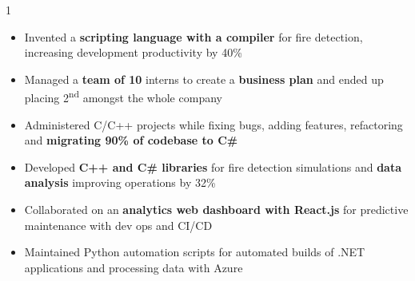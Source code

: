 \documentclass[11pt,a4paper,ragged2e]{altacv}
\begin{document}
\begin{paracol}{1}
\begin{itemize}
\item Invented a \textbf{scripting language with a compiler} for fire detection, increasing development productivity by 40\%
\item Managed a \textbf{team of 10} interns to create a \textbf{business plan} and ended up placing 2\textsuperscript{nd} amongst the whole company
\item Administered C/C++ projects while fixing bugs, adding features, refactoring and \textbf{migrating 90\% of codebase to C\#}
\item Developed \textbf{C++ and C\# libraries} for fire detection simulations and \textbf{data analysis} improving operations by 32\%
\item Collaborated on an \textbf{analytics web dashboard with React.js} for predictive maintenance with dev ops and CI/CD
\item Maintained Python automation scripts for automated builds of .NET applications and processing data with Azure
\end{itemize}
\tightdivider


\end{paracol}
\end{document}
